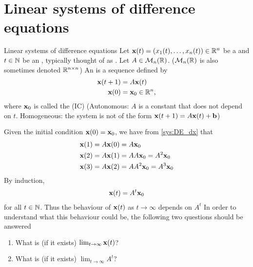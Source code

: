 \documentclass[aspectratio=169]{beamer}
\begin{document}
\section{Linear systems of difference equations}
\label{sec:linear_DE}
\begin{frame}{Linear systems of difference equations}
Let $\mathbf{x}(t)=(x_1(t),\ldots,x_n(t))\in \mathbb{R}^n$ be a  and $t\in \mathbb{N}$ be an , typically thought of as . Let $A\in \mathcal{M}_n(\mathbb{R})$. ($\mathcal{M}_n(\mathbb{R})$ is also sometimes denoted $\mathbb{R}^{n\times n}$)
\vfill
An  is a sequence defined by
\begin{subequations}\label{sys:DE}
\begin{align}
\mathbf{x}(t+1) &= A\mathbf{x}(t) \label{sys:DE_dx}\\
\mathbf{x}(0) &=\mathbf{x}_0\in \mathbb{R}^n, \label{sys:DE_IC}
\end{align}	
\end{subequations}
where $\mathbf{x}_0$ is called the  (IC)
\vfill
(Autonomous: $A$ is a constant that does not depend on $t$. Homogeneous: the system is not of the form $\mathbf{x}(t+1)=A\mathbf{x}(t)+\mathbf{b}$)
\end{frame}

\begin{frame}
Given the initial condition $\mathbf{x}(0)=\mathbf{x}_0$, we have from \eqref{sys:DE_dx} that
\begin{align*}
 \mathbf{x}(1) &= A\mathbf{x}(0)=A\mathbf{x}_0\\
 \mathbf{x}(2) &= A\mathbf{x}(1)= AA\mathbf{x}_0=A^2\mathbf{x}_0 \\
 \mathbf{x}(3) &= A\mathbf{x}(2)=AA^2\mathbf{x}_0=A^3\mathbf{x}_0
\end{align*}
\vfill
By induction,
\[
\mathbf{x}(t)=A^t\mathbf{x}_0
\] 
for all $t\in\mathbb{N}$.
Thus the behaviour of $\mathbf{x}(t)$ as $t\to\infty$ depends on $A^t$
\vfill
In order to understand what this behaviour could be, the following two questions should be answered
\begin{enumerate}
	\item What is (if it exists) $\lim_{t\to \infty} \mathbf{x}(t)$? 
	\item What is (if it exists) $\lim_{t \to \infty} A^t$? 
\end{enumerate}
\end{frame}
\end{document}
